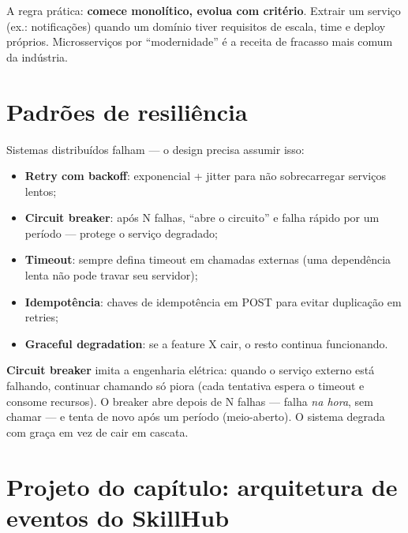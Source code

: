 \begin{caixaconceito}
A regra prática: \textbf{comece monolítico, evolua com critério}. Extrair um
serviço (ex.: notificações) quando um domínio tiver requisitos de escala,
time e deploy próprios. Microsserviços por ``modernidade'' é a receita de
fracasso mais comum da indústria.
\end{caixaconceito}

\section{Padrões de resiliência}

Sistemas distribuídos falham — o design precisa assumir isso:

\begin{itemize}[leftmargin=*, itemsep=0.4em]
  \item \textbf{Retry com backoff}: exponencial + jitter para não sobrecarregar serviços lentos;
  \item \textbf{Circuit breaker}: após N falhas, ``abre o circuito'' e falha rápido por um período — protege o serviço degradado;
  \item \textbf{Timeout}: sempre defina timeout em chamadas externas (uma dependência lenta não pode travar seu servidor);
  \item \textbf{Idempotência}: chaves de idempotência em POST para evitar duplicação em retries;
  \item \textbf{Graceful degradation}: se a feature X cair, o resto continua funcionando.
\end{itemize}

\begin{caixaconceito}
\textbf{Circuit breaker} imita a engenharia elétrica: quando o serviço externo
está falhando, continuar chamando só piora (cada tentativa espera o timeout e
consome recursos). O breaker abre depois de N falhas — falha \emph{na hora},
sem chamar — e tenta de novo após um período (meio-aberto). O sistema degrada
com graça em vez de cair em cascata.
\end{caixaconceito}

\section{Projeto do capítulo: arquitetura de eventos do SkillHub}
\label{sec:projeto21}

